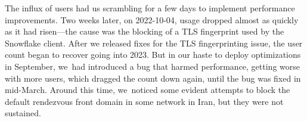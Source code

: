 \documentclass[letterpaper,twocolumn]{article}
\begin{document}
The influx of users had us scrambling for a few days
to implement performance improvements.
Two weeks later, on \mbox{2022-10-04},
usage dropped almost as quickly as it had risen---the
cause was the blocking of a TLS fingerprint
used by the Snowflake client.
After we released fixes for the TLS fingerprinting issue,
the user count began to recover going into 2023.
But in our haste to deploy optimizations in September,
we~had introduced a bug that harmed performance,
getting worse with more users,
which dragged the count down again,
until the bug was fixed in mid-March.
Around this time, we~noticed some evident attempts to block the default
rendezvous front domain in some network in Iran,
but they were not sustained.
\end{document}
